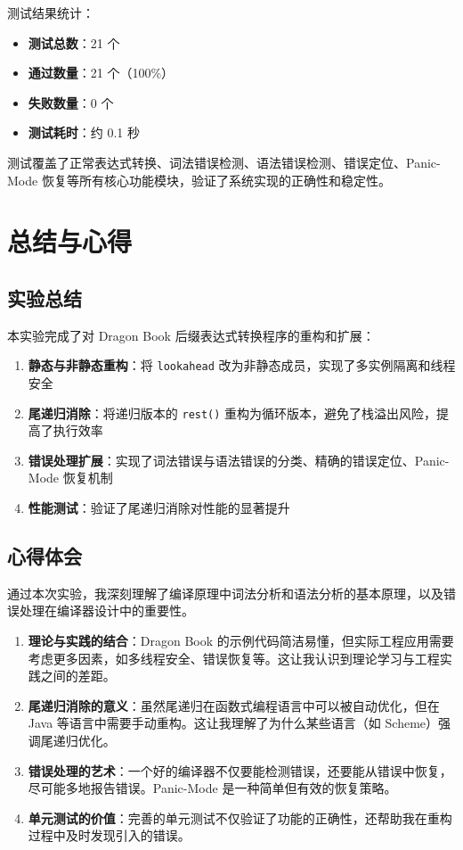 \documentclass[a4paper]{article}
\begin{document}
测试结果统计：
\begin{itemize}
    \item \textbf{测试总数}：21 个
    \item \textbf{通过数量}：21 个（100\%）
    \item \textbf{失败数量}：0 个
    \item \textbf{测试耗时}：约 0.1 秒
\end{itemize}

测试覆盖了正常表达式转换、词法错误检测、语法错误检测、错误定位、Panic-Mode 恢复等所有核心功能模块，验证了系统实现的正确性和稳定性。

\section{总结与心得}

\subsection{实验总结}
本实验完成了对 Dragon Book 后缀表达式转换程序的重构和扩展：
\begin{enumerate}
    \item \textbf{静态与非静态重构}：将 \texttt{lookahead} 改为非静态成员，实现了多实例隔离和线程安全
    \item \textbf{尾递归消除}：将递归版本的 \texttt{rest()} 重构为循环版本，避免了栈溢出风险，提高了执行效率
    \item \textbf{错误处理扩展}：实现了词法错误与语法错误的分类、精确的错误定位、Panic-Mode 恢复机制
    \item \textbf{性能测试}：验证了尾递归消除对性能的显著提升
\end{enumerate}

\subsection{心得体会}

通过本次实验，我深刻理解了编译原理中词法分析和语法分析的基本原理，以及错误处理在编译器设计中的重要性。

\begin{enumerate}
    \item \textbf{理论与实践的结合}：Dragon Book 的示例代码简洁易懂，但实际工程应用需要考虑更多因素，如多线程安全、错误恢复等。这让我认识到理论学习与工程实践之间的差距。

    \item \textbf{尾递归消除的意义}：虽然尾递归在函数式编程语言中可以被自动优化，但在 Java 等语言中需要手动重构。这让我理解了为什么某些语言（如 Scheme）强调尾递归优化。

    \item \textbf{错误处理的艺术}：一个好的编译器不仅要能检测错误，还要能从错误中恢复，尽可能多地报告错误。Panic-Mode 是一种简单但有效的恢复策略。

    \item \textbf{单元测试的价值}：完善的单元测试不仅验证了功能的正确性，还帮助我在重构过程中及时发现引入的错误。
\end{enumerate}
\end{document}
